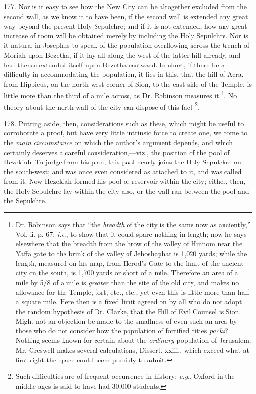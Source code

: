 177.
Nor is it easy to see how the New City can be altogether excluded from
the second wall, as we know it to have been, if the second wall is
extended any great way beyond the present Holy Sepulchre; and if it is
not extended, how any great increase of room will be obtained merely
by including the Holy Sepulchre. Nor is it natural in Josephus to
speak of the population overflowing across the trench of Moriah upon
Bezetha, if it lay all along the west of the latter hill
already, and had thence extended itself upon Bezetha eastward. In
short, if there be a difficulty in accommodating the population, it
lies in this, that the hill of Acra, from Hippicus, on the north-west
corner of Sion, to the east side of the Temple, is little more than
the third of a mile across, as Dr. Robinson measures it \footnote{Dr. Robinson says that ``the \emph{breadth} of the city is the same now
as anciently,'' Vol. ii. p. 67; \emph{i.e}., to show that it could
spare nothing in length; now he says elsewhere that the breadth from
the brow of the valley of Hinnom near the Yaffa gate to the brink of
the valley of Jehoshaphat is 1,020 yards; while the length, measured
on his map, from Herod's Gate to the limit of the ancient city on the
south, is 1,700 yards or short of a mile. Therefore an area of a mile
by 5/8 of a mile is \emph{greater} than the site of the old city,
and makes no allowance for the Temple, fort, etc., etc., yet even this
is little more than half a square mile. Here then is a fixed limit
agreed on by all who do not adopt the random hypothesis of Dr. Clarke,
that the Hill of Evil Counsel is Sion. Might not an objection be made
to the smallness of even such an area by those who do not consider how
the population of fortified cities \emph{packs}? Nothing seems known
for certain about the \emph{ordinary} population of Jerusalem. Mr.
Greswell makes several calculations, Dissert. xxiii., which exceed
what at first sight the space could seem possibly to admit.}. No theory about the north wall of the city can dispose of
this fact \footnote{Such difficulties are of frequent occurrence in history; \emph{e.g}.,
Oxford in the middle ages is said to have had 30,000 students.}.

178.
Putting aside, then, considerations such as these, which might be
useful to corroborate a proof, but have very little intrinsic force to
create one, we come to the \emph{main circumstance} on which the
author's argument depends, and which certainly deserves a
careful consideration,—viz., the position of the pool of Hezekiah.
To judge from his plan, this pool nearly joins the Holy Sepulchre on
the south-west; and was once even considered as attached to it, and
was called from it. Now Hezekiah formed his pool or reservoir within
the city; either, then, the Holy Sepulchre lay within the city also,
or the wall ran between the pool and the Sepulchre.

